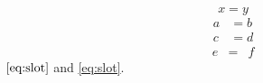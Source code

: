 \documentclass{article}
\begin{document}
\begin{equation}
  \label{eq:slot}
  x = y
\end{equation}
\begin{align}\label{eq:adjacent}
  a &= b \\
  c &= d \label{eq:body}
\end{align}
\begin{equation}



  \label{eq:past-the-slot}
\end{equation}
\begin{equation}
  \label{eq:crlf}
\end{equation}
\begin{equation} [a,b] \label{eq:bracket} \end{equation}
\begin{eqnarray}
  \label{eq:kernel} e &=& f
\end{eqnarray}
\[ \label{eq:display} \]
$$ \label{eq:dollars} $$
$ \ref{eq:slot} $ and \ref{eq:slot}.
\end{document}
